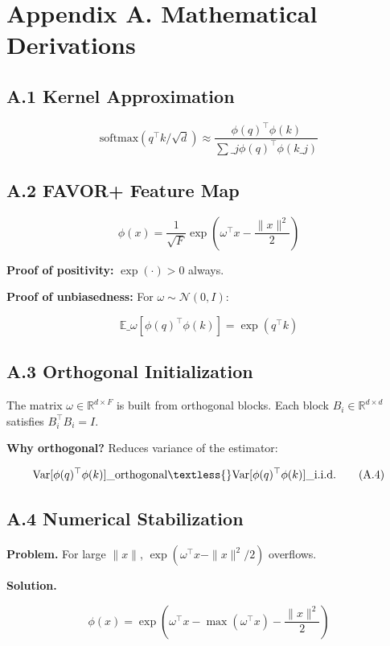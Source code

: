
\section{Appendix A. Mathematical Derivations}

\subsection{A.1 Kernel Approximation}

\[
\text{softmax}(q^\top k / \sqrt{d}) \approx \frac{\phi(q)^\top \phi(k)}{\sum\_j \phi(q)^\top \phi(k\_j)}
\tag{A.1}
\]

\subsection{A.2 FAVOR+ Feature Map}

\[
\phi(x) = \frac{1}{\sqrt{F}} \exp\!\left(\omega^\top x - \frac{\|x\|^2}{2}\right)
\tag{A.2}
\]

\textbf{Proof of positivity:} $\exp(\cdot) > 0$ always.

\textbf{Proof of unbiasedness:} For $\omega \sim \mathcal{N}(0, I)$:

\[
\mathbb{E}\_\omega[\phi(q)^\top \phi(k)] = \exp(q^\top k)
\tag{A.3}
\]

\subsection{A.3 Orthogonal Initialization}

The matrix $\omega \in \mathbb{R}^{d \times F}$ is built from orthogonal 
blocks. Each block $B_i \in \mathbb{R}^{d \times d}$ satisfies 
$B_i^\top B_i = I$.

\textbf{Why orthogonal?} Reduces variance of the estimator:

\[
\text{Var}[\phi(q)^\top \phi(k)]\_{\text{orthogonal}} \textless{} \text{Var}[\phi(q)^\top \phi(k)]\_{\text{i.i.d.}}
\tag{A.4}
\]

\subsection{A.4 Numerical Stabilization}

\textbf{Problem.} For large $\|x\|$, $\exp(\omega^\top x - \|x\|^2/2)$ overflows.

\textbf{Solution.}

\[
\phi(x) = \exp\!\left(\omega^\top x - \max(\omega^\top x) - \frac{\|x\|^2}{2}\right)
\tag{A.5}
\]

